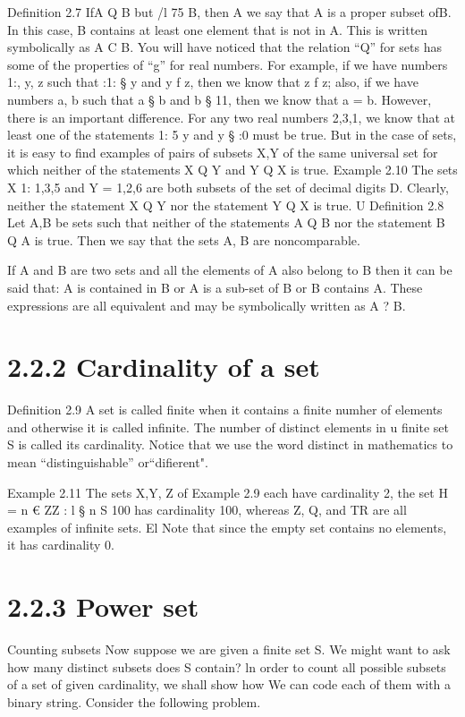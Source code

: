 {{{Deﬁnition 2.7 IfA Q B but /l 75 B, then A we say that A is a proper subset ofB. In this case,
B contains at least one element that is not in A. This is written symbolically as A C B.
You will have noticed that the relation “Q” for sets has some of the properties of “g” for real
numbers. For example, if we have numbers 1:, y, z such that :1: § y and y f z, then we know that
z f z; also, if we have numbers a, b such that a § b and b § 11, then we know that a = b. However,
there is an important difference. 
\smallskip 
\smallskip 
For any two real numbers 2,3,1, we know that at least one of the
statements 1: 5 y and y § :0 must be true. But in the case of sets, it is easy to ﬁnd examples of
pairs of subsets X,Y of the same universal set for which neither of the statements X Q Y and
Y Q X is true.
\smallskip 
\smallskip 
Example 2.10 The sets X 1: {1,3,5} and Y = {1,2,6} are both subsets of the set of decimal
digits D. Clearly, neither the statement X Q Y nor the statement Y Q X is true. U
Deﬁnition 2.8 Let A,B be sets such that neither of the statements A Q B nor the statement
B Q A is true. Then we say that the sets A, B are noncomparable.
\smallskip 
\smallskip 

If A and B are two sets and all the elements of A also belong to B then it
can be said that:
A is contained in B
or A is a sub-set of B
or B contains A.
These expressions are all equivalent and may be symbolically written as
A ? B.
\smallskip 
\section{2.2.2 Cardinality of a set}
Deﬁnition 2.9 A set is called finite when it contains a finite numher of elements and otherwise
it is called inﬁnite. The number of distinct elements in u ﬁnite set S is called its cardinality.
Notice that we use the word distinct in mathematics to mean “distinguishable” or“diﬁerent".

\smallskip 
Example 2.11 The sets X,Y, Z of Example 2.9 each have cardinality 2, the set H = {n € ZZ : l §
n S 100} has cardinality 100, whereas Z, Q, and TR are all examples of inﬁnite sets. El
Note that since the empty set contains no elements, it has cardinality 0.
\section{2.2.3 Power set}
Counting subsets
Now suppose we are given a ﬁnite set S. We might want to ask how many distinct subsets does S
contain? ln order to count all possible subsets of a set of given cardinality, we shall show how We
can code each of them with a binary string. Consider the following problem.

}}}
